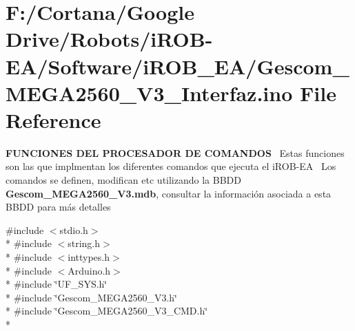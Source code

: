 \hypertarget{_gescom___m_e_g_a2560___v3___interfaz_8ino}{}\section{F\+:/\+Cortana/\+Google Drive/\+Robots/i\+R\+O\+B-\/\+E\+A/\+Software/i\+R\+O\+B\+\_\+\+E\+A/\+Gescom\+\_\+\+M\+E\+G\+A2560\+\_\+\+V3\+\_\+\+Interfaz.ino File Reference}
\label{_gescom___m_e_g_a2560___v3___interfaz_8ino}


{\bfseries F\+U\+N\+C\+I\+O\+N\+ES D\+EL P\+R\+O\+C\+E\+S\+A\+D\+OR DE C\+O\+M\+A\+N\+D\+OS}~\newline
 Estas funciones son las que implmentan los diferentes comandos que ejecuta el i\+R\+O\+B-\/\+EA~\newline
 Los comandos se definen, modifican etc utilizando la B\+B\+DD {\bfseries Gescom\+\_\+\+M\+E\+G\+A2560\+\_\+\+V3.\+mdb}, consultar la información asociada a esta B\+B\+DD para más detalles~\newline
 


{\ttfamily \#include $<$stdio.\+h$>$}\\*
{\ttfamily \#include $<$string.\+h$>$}\\*
{\ttfamily \#include $<$inttypes.\+h$>$}\\*
{\ttfamily \#include $<$Arduino.\+h$>$}\\*
{\ttfamily \#include \char`\"{}U\+F\+\_\+\+S\+Y\+S.\+h\char`\"{}}\\*
{\ttfamily \#include \char`\"{}Gescom\+\_\+\+M\+E\+G\+A2560\+\_\+\+V3.\+h\char`\"{}}\\*
{\ttfamily \#include \char`\"{}Gescom\+\_\+\+M\+E\+G\+A2560\+\_\+\+V3\+\_\+\+C\+M\+D.\+h\char`\"{}}\\*
